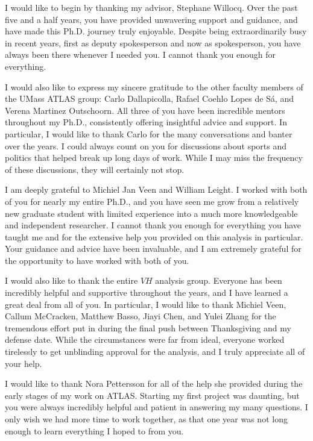 I would like to begin by thanking my advisor, Stephane Willocq. Over the past five and a half years, you have provided unwavering support and guidance, and have made this Ph.D. journey truly enjoyable. Despite being extraordinarily busy in recent years, first as deputy spokesperson and now as spokesperson, you have always been there whenever I needed you. I cannot thank you enough for everything.

I would also like to express my sincere gratitude to the other faculty members of the UMass ATLAS group: Carlo Dallapicolla, Rafael Coehlo Lopes de Sá, and Verena Martinez Outschoorn. All three of you have been incredible mentors throughout my Ph.D., consistently offering insightful advice and support. In particular, I would like to thank Carlo for the many conversations and banter over the years. I could always count on you for discussions about sports and politics that helped break up long days of work. While I may miss the frequency of these discussions, they will certainly not stop.

I am deeply grateful to Michiel Jan Veen and William Leight. I worked with both of you for nearly my entire Ph.D., and you have seen me grow from a relatively new graduate student with limited experience into a much more knowledgeable and independent researcher. I cannot thank you enough for everything you have taught me and for the extensive help you provided on this analysis in particular. Your guidance and advice have been invaluable, and I am extremely grateful for the opportunity to have worked with both of you.

I would also like to thank the entire $VH$ analysis group. Everyone has been incredibly helpful and supportive throughout the years, and I have learned a great deal from all of you. In particular, I would like to thank Michiel Veen, Callum McCracken, Matthew Basso, Jiayi Chen, and Yulei Zhang for the tremendous effort put in during the final push between Thanksgiving and my defense date. While the circumstances were far from ideal, everyone worked tirelessly to get unblinding approval for the analysis, and I truly appreciate all of your help.

I would like to thank Nora Pettersson for all of the help she provided during the early stages of my work on ATLAS. Starting my first project was daunting, but you were always incredibly helpful and patient in answering my many questions. I only wish we had more time to work together, as that one year was not long enough to learn everything I hoped to from you.

